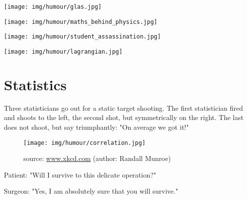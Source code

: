 	\begin{center}\underline{\hspace{5 cm}}\end{center}
	
	\begin{center}
	\texttt{[image: img/humour/glas.jpg]}
	\end{center}
	
	\begin{center}
	\texttt{[image: img/humour/maths\_behind\_physics.jpg]}
	\end{center}
	
	\begin{center}\underline{\hspace{5 cm}}\end{center}
	
	\begin{center}
	\texttt{[image: img/humour/student\_assassination.jpg]}
	\end{center}
	
	\begin{center}
	\texttt{[image: img/humour/lagrangian.jpg]}
	\end{center}

	\pagebreak
	\section{Statistics}
	Three statisticians go out for a static target shooting. The first statistician fired and shoots to the left, the second shot, but symmetrically on the right. The last does not shoot, but say triumphantly: "On average we got it!"

\begin{center}\underline{\hspace{5 cm}}\end{center}

	\begin{figure}[H]
		\centering
		\texttt{[image: img/humour/correlation.jpg]}
		\caption[]{source: \url{www.xkcd.com} (author: Randall Munroe)}
	\end{figure}

\begin{center}\underline{\hspace{5 cm}}\end{center}

Patient: "Will I survive to this delicate operation?"

Surgeon: "Yes, I am absolutely sure that you will survive."

